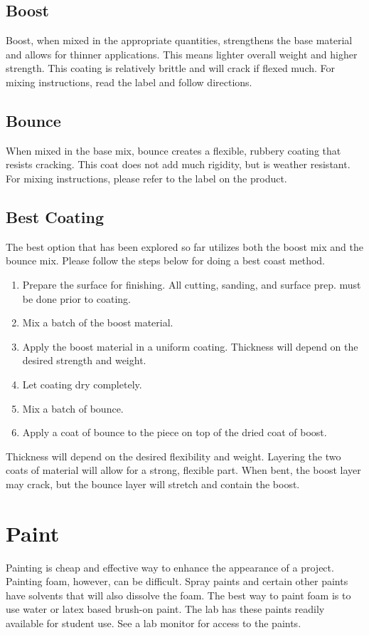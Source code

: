 \subsection{Boost}
Boost, when mixed in the appropriate quantities, strengthens the base material and allows for thinner applications. This means lighter overall weight and higher strength. This coating is relatively brittle and will crack if flexed much. For mixing instructions, read the label and follow directions.
\subsection{Bounce}
When mixed in the base mix, bounce creates a flexible, rubbery coating that resists cracking. This coat does not add much rigidity, but is weather resistant. For mixing instructions, please refer to the label on the product.
\subsection{Best Coating}
The best option that has been explored so far utilizes both the boost mix and the bounce mix.  Please follow the steps below for doing a best coast method.

\begin{enumerate}
\item Prepare the surface for finishing.  All cutting, sanding, and surface prep. must be done prior to coating.
\item Mix a batch of the boost material.
\item Apply the boost material in a uniform coating.  Thickness will depend on the desired strength and weight.
\item Let coating dry completely.
\item Mix a batch of bounce.
\item Apply a coat of bounce to the piece on top of the dried coat of boost.
\end{enumerate}
Thickness will depend on the desired flexibility and weight.  Layering the two coats of material will allow for a strong, flexible part.  When bent, the boost layer may crack, but the bounce layer will stretch and contain the boost.

\section{Paint}
Painting is cheap and effective way to enhance the appearance of a project. Painting foam, however, can be difficult. Spray paints and certain other paints have solvents that will also dissolve the foam. The best way to paint foam is to use water or latex based brush-on paint. The lab has these paints readily available for student use. See a lab monitor for access to the paints.